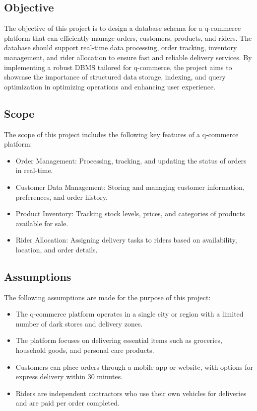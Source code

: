 \documentclass{article}
\begin{document}
\noindent
\subsection{Objective}
The objective of this project is to design a database schema for a q-commerce platform that can efficiently manage orders, customers, products, and riders. The database should support real-time data processing, order tracking, inventory management, and rider allocation to ensure fast and reliable delivery services. By implementing a robust DBMS tailored for q-commerce, the project aims to showcase the importance of structured data storage, indexing, and query optimization in optimizing operations and enhancing user experience.

\subsection{Scope}
The scope of this project includes the following key features of a q-commerce platform:
\begin{itemize}
    \item Order Management: Processing, tracking, and updating the status of orders in real-time.
    \item Customer Data Management: Storing and managing customer information, preferences, and order history.
    \item Product Inventory: Tracking stock levels, prices, and categories of products available for sale.
    \item Rider Allocation: Assigning delivery tasks to riders based on availability, location, and order details.
\end{itemize}

\subsection{Assumptions}
The following assumptions are made for the purpose of this project:
\begin{itemize}
    \item The q-commerce platform operates in a single city or region with a limited number of dark stores and delivery zones.
    \item The platform focuses on delivering essential items such as groceries, household goods, and personal care products.
    \item Customers can place orders through a mobile app or website, with options for express delivery within 30 minutes.
    \item Riders are independent contractors who use their own vehicles for deliveries and are paid per order completed.
\end{itemize}
\end{document}
